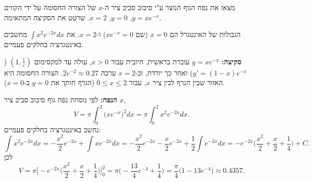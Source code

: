 
\begin{question}
מצאו את נפח הגוף הנוצר ע"י סיבוב סביב ציר ה-$x$ של הצורה החסומה על ידי הקווים $y=xe^{-x}$, $y=0$, $x=2$. שרטט את הסקיצה המתאימה.
\end{question}

\begin{hint}
הגבולות של האינטגרל הם $x=0$ (שם $xe^{-x}=0$) ו-$x=2$. את $\int x^2e^{-2x}dx$ מחשבים באינטגרציה בחלקים פעמיים.
\end{hint}

\begin{solution}
\textbf{סקיצה:} $y=xe^{-x}$ עוברת בראשית, חיובית עבור $x>0$, עולה עד למקסימום $(1,\frac1e)$ ($y'=(1-x)e^{-x}$) ואחר כך יורדת, וב-$x=2$ ערכה $2e^{-2}\approx0.27$. הצורה החסומה היא האזור שבין הגרף לבין ציר $x$, עבור $0\le x\le 2$ (הגרף חותך את $y=0$ ב-$x=0$).

\textbf{הנפח:} לפי נוסחת נפח גוף סיבוב סביב ציר $x$,
\[ V=\pi\int_0^2\big(xe^{-x}\big)^2dx=\pi\int_0^2x^2e^{-2x}dx . \]
נחשב באינטגרציה בחלקים פעמיים:
\[ \int x^2e^{-2x}dx=-\frac{x^2}{2}e^{-2x}+\int xe^{-2x}dx=-\frac{x^2}{2}e^{-2x}-\frac{x}{2}e^{-2x}+\frac12\int e^{-2x}dx
=-e^{-2x}\Big(\frac{x^2}{2}+\frac{x}{2}+\frac14\Big)+C . \]
לכן
\[ V=\pi\Big[-e^{-2x}\Big(\frac{x^2}{2}+\frac{x}{2}+\frac14\Big)\Big]_0^2=\pi\Big(-\frac{13}{4}e^{-4}+\frac14\Big)=\boxed{\frac{\pi}{4}\big(1-13e^{-4}\big)}\approx0.4357 . \]
\end{solution}
